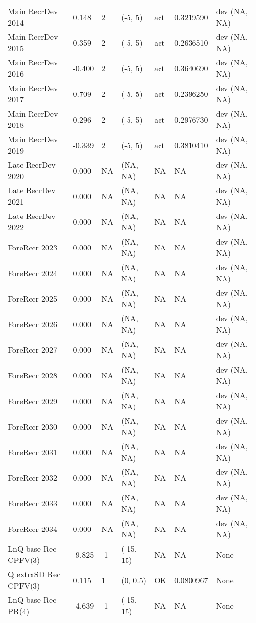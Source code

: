 \documentclass[11pt,
  english,
  letterpaper,
]{article}
\begin{document}
\begin{landscape}
\begin{longtable}[t]{>{\raggedright\arraybackslash}p{7cm}lllll>{\raggedright\arraybackslash}p{4cm}}
Main RecrDev 2014 & 0.148 & 2 & (-5, 5) & act & 0.3219590 & dev (NA, NA)\\
Main RecrDev 2015 & 0.359 & 2 & (-5, 5) & act & 0.2636510 & dev (NA, NA)\\
Main RecrDev 2016 & -0.400 & 2 & (-5, 5) & act & 0.3640690 & dev (NA, NA)\\
Main RecrDev 2017 & 0.709 & 2 & (-5, 5) & act & 0.2396250 & dev (NA, NA)\\
Main RecrDev 2018 & 0.296 & 2 & (-5, 5) & act & 0.2976730 & dev (NA, NA)\\
Main RecrDev 2019 & -0.339 & 2 & (-5, 5) & act & 0.3810410 & dev (NA, NA)\\
Late RecrDev 2020 & 0.000 & NA & (NA, NA) & NA & NA & dev (NA, NA)\\
Late RecrDev 2021 & 0.000 & NA & (NA, NA) & NA & NA & dev (NA, NA)\\
Late RecrDev 2022 & 0.000 & NA & (NA, NA) & NA & NA & dev (NA, NA)\\
ForeRecr 2023 & 0.000 & NA & (NA, NA) & NA & NA & dev (NA, NA)\\
ForeRecr 2024 & 0.000 & NA & (NA, NA) & NA & NA & dev (NA, NA)\\
ForeRecr 2025 & 0.000 & NA & (NA, NA) & NA & NA & dev (NA, NA)\\
ForeRecr 2026 & 0.000 & NA & (NA, NA) & NA & NA & dev (NA, NA)\\
ForeRecr 2027 & 0.000 & NA & (NA, NA) & NA & NA & dev (NA, NA)\\
ForeRecr 2028 & 0.000 & NA & (NA, NA) & NA & NA & dev (NA, NA)\\
ForeRecr 2029 & 0.000 & NA & (NA, NA) & NA & NA & dev (NA, NA)\\
ForeRecr 2030 & 0.000 & NA & (NA, NA) & NA & NA & dev (NA, NA)\\
ForeRecr 2031 & 0.000 & NA & (NA, NA) & NA & NA & dev (NA, NA)\\
ForeRecr 2032 & 0.000 & NA & (NA, NA) & NA & NA & dev (NA, NA)\\
ForeRecr 2033 & 0.000 & NA & (NA, NA) & NA & NA & dev (NA, NA)\\
ForeRecr 2034 & 0.000 & NA & (NA, NA) & NA & NA & dev (NA, NA)\\
LnQ base Rec CPFV(3) & -9.825 & -1 & (-15, 15) & NA & NA & None\\
Q extraSD Rec CPFV(3) & 0.115 & 1 & (0, 0.5) & OK & 0.0800967 & None\\
LnQ base Rec PR(4) & -4.639 & -1 & (-15, 15) & NA & NA & None\\

\end{longtable}
\end{landscape}
\end{document}
